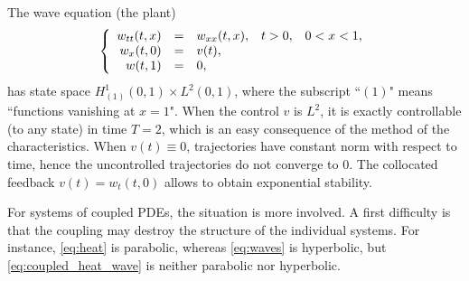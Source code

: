 \documentclass[10pt]{article}
\begin{document}
The wave equation (the plant)
\begin{equation}\label{eq:waves}
\left\lbrace \begin{array}{rcl cc}
w_{tt}(t,x) &=& w_{xx}(t,x),&t>0,& 0 < x < 1,\\
w_x(t,0) &=& v(t),\\
w(t,1) &=& 0, 
\end{array}\right.
\end{equation}
has state space $H^1_{(1)}(0,1)\times L^2(0,1)$, where the subscript ``$(1)$" means ``functions vanishing at $x=1$". When the control $v$ is $L^2$, it is exactly controllable (to any state) in time $T = 2$, which is an easy consequence of the method of the characteristics. When $v(t) \equiv 0$, trajectories have constant norm with respect to time, hence the uncontrolled trajectories do not converge to $0$. The collocated feedback $v(t) = w_t(t,0)$ allows to obtain exponential stability. 

For systems of coupled PDEs, the situation is more involved. A first difficulty is that the coupling may destroy the structure of the individual systems. For instance, \eqref{eq:heat} is parabolic, whereas \eqref{eq:waves} is hyperbolic, but  \eqref{eq:coupled_heat_wave} is neither parabolic nor hyperbolic. 
\end{document}
